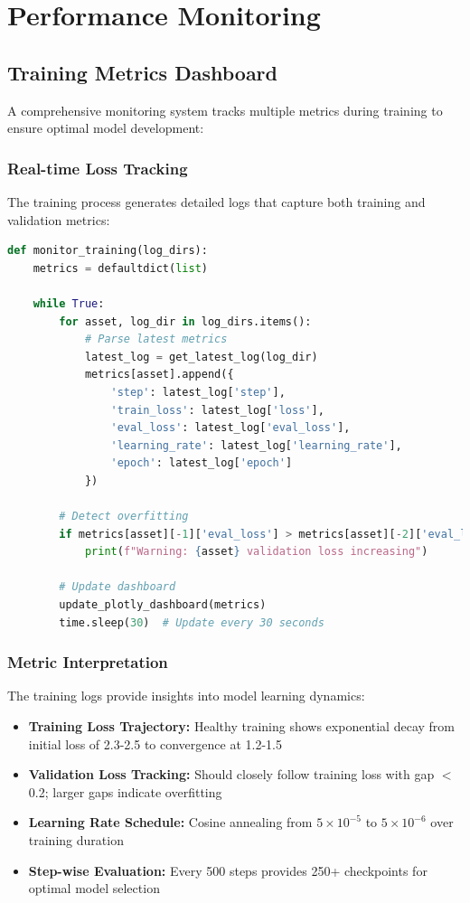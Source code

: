 \documentclass{report}
\begin{document}
\section{Performance Monitoring}

\subsection{Training Metrics Dashboard}

A comprehensive monitoring system tracks multiple metrics during training to ensure optimal model development:

\subsubsection{Real-time Loss Tracking}

The training process generates detailed logs that capture both training and validation metrics:

\begin{lstlisting}[language=Python, caption=Training metrics monitoring]
def monitor_training(log_dirs):
    metrics = defaultdict(list)
    
    while True:
        for asset, log_dir in log_dirs.items():
            # Parse latest metrics
            latest_log = get_latest_log(log_dir)
            metrics[asset].append({
                'step': latest_log['step'],
                'train_loss': latest_log['loss'],
                'eval_loss': latest_log['eval_loss'],
                'learning_rate': latest_log['learning_rate'],
                'epoch': latest_log['epoch']
            })
        
        # Detect overfitting
        if metrics[asset][-1]['eval_loss'] > metrics[asset][-2]['eval_loss']:
            print(f"Warning: {asset} validation loss increasing")
        
        # Update dashboard
        update_plotly_dashboard(metrics)
        time.sleep(30)  # Update every 30 seconds
\end{lstlisting}

\subsubsection{Metric Interpretation}

The training logs provide insights into model learning dynamics:

\begin{itemize}
    \item \textbf{Training Loss Trajectory:} Healthy training shows exponential decay from initial loss of 2.3-2.5 to convergence at 1.2-1.5
    \item \textbf{Validation Loss Tracking:} Should closely follow training loss with gap $<$ 0.2; larger gaps indicate overfitting
    \item \textbf{Learning Rate Schedule:} Cosine annealing from $5 \times 10^{-5}$ to $5 \times 10^{-6}$ over training duration
    \item \textbf{Step-wise Evaluation:} Every 500 steps provides 250+ checkpoints for optimal model selection
\end{itemize}
\end{document}
